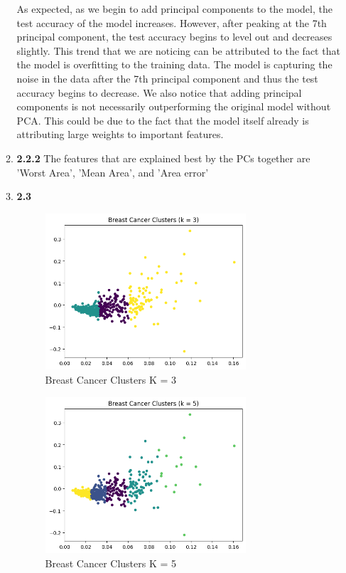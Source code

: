 \documentclass[12pt]{article}
\begin{document}
\begin{enumerate}
\begin{enumerate}
    As expected, as we begin to add principal components to the model, the test accuracy of the model increases. However, after peaking at the 7th principal component, the test accuracy begins to level out and decreases slightly. This trend that we
    are noticing can be attributed to the fact that the model is overfitting to the training data. The model is capturing the noise in the data after the 7th principal component and thus the test accuracy begins to decrease. We also notice that
    adding principal components is not necessarily outperforming the original model without PCA. This could be due to the fact that the model itself already is attributing large weights to important features. 
    \item \textbf{2.2.2}
      The features that are explained best by the PCs together are 'Worst Area', 'Mean Area', and 'Area error'
    \item \textbf{2.3}

    \begin{figure}[H]
      \centering 
      \includegraphics[width=0.75\textwidth]{2_3_3.png}
      \caption{Breast Cancer Clusters K = 3}
    \end{figure}

    \begin{figure}[H]
      \centering 
      \includegraphics[width=0.75\textwidth]{2_3_5.png}
      \caption{Breast Cancer Clusters K = 5}
    \end{figure}


\end{enumerate}
\end{enumerate}
\end{document}
